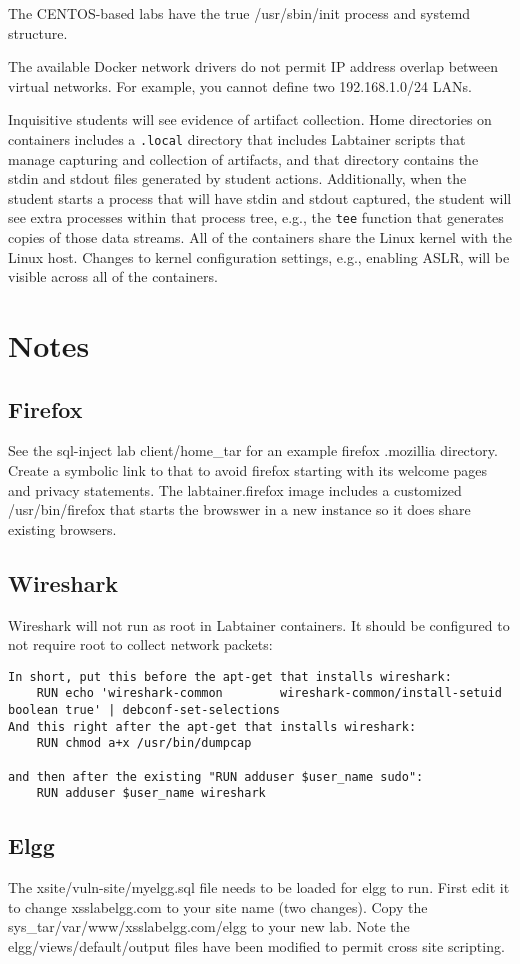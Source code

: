\documentclass[12pt]{article}
\begin{document}
The CENTOS-based labs have the true /usr/sbin/init process and systemd structure.

The available Docker network drivers do not permit IP address overlap between virtual networks.
For example, you cannot define two 192.168.1.0/24 LANs.

Inquisitive students will see evidence of artifact collection.  Home directories
on containers includes a \texttt{.local} directory that includes Labtainer scripts that manage
capturing and collection of artifacts, and that directory contains the stdin and
stdout files generated by student actions. Additionally, when the student starts a process
that will have stdin and stdout captured, the student will see extra processes within
that process tree, e.g., the \texttt{tee} function that generates copies of those data streams.
All of the containers share the Linux kernel with the Linux host.  Changes to
kernel configuration settings, e.g., enabling ASLR, will be visible across all
of the containers.

\section{Notes} \label{Notes}
\subsection{Firefox}
See the sql-inject lab client/home\_tar for an example firefox .mozillia directory.  
Create a symbolic link to that to avoid firefox starting with its welcome pages and
privacy statements.
The labtainer.firefox image includes a customized /usr/bin/firefox that starts the
browswer in a new instance so it does share existing browsers.
\subsection{Wireshark}
Wireshark will not run as root in Labtainer containers.  It should be configured to not
require root to collect network packets:
\begin{verbatim}
In short, put this before the apt-get that installs wireshark:
    RUN echo 'wireshark-common        wireshark-common/install-setuid boolean true' | debconf-set-selections
And this right after the apt-get that installs wireshark:
    RUN chmod a+x /usr/bin/dumpcap

and then after the existing "RUN adduser $user_name sudo":
    RUN adduser $user_name wireshark
\end{verbatim}
\subsection{Elgg}
The xsite/vuln-site/myelgg.sql file needs to be loaded for elgg to run.  First edit it to
change xsslabelgg.com to your site name (two changes).  Copy the sys\_tar/var/www/xsslabelgg.com/elgg
to your new lab.  Note the elgg/views/default/output files have been modified to permit cross site scripting.
\end{document}
